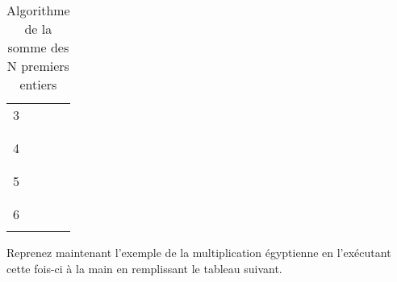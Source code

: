 \documentclass[11pt,a4paper]{article}
\begin{document}
\begin{table}[h!]
\begin{minipage}{0.4\textwidth}
\begin{tabular}{|C{1cm}|C{1cm}|C{1cm}|}
        3    &    &       \\
             &    &       \\
        \hline
             &    &       \\
        4    &    &       \\
             &    &       \\
        \hline
             &    &       \\
        5    &    &       \\
             &    &       \\
        \hline
             &    &       \\
        6    &    &       \\
             &    &       \\
        \hline
    \end{tabular}
  \end{minipage}
  \caption{Algorithme de la somme des N premiers entiers}
  \label{somme-n-premiers-entiers}
\end{table}


\vfillLast

\newpage

\vfillFirst


Reprenez maintenant l'exemple de la multiplication égyptienne en l'exécutant cette fois-ci à la main en remplissant le tableau suivant.



\bigskip
\end{document}
